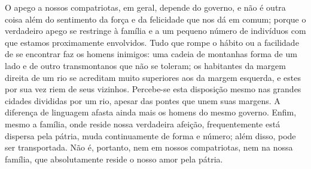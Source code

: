  O apego a nossos compatriotas, em geral, depende do governo, e não é
outra coisa além do sentimento da força e da felicidade que nos dá em
comum; porque o verdadeiro apego se restringe à família e a um pequeno
número de indivíduos com que estamos proximamente envolvidos. Tudo que
rompe o hábito ou a facilidade de se encontrar faz os homens inimigos:
uma cadeia de montanhas forma de um lado e de outro transmontanos que
não se toleram; os habitantes da margem direita de um rio se acreditam
muito superiores aos da margem esquerda, e estes por sua vez riem de
seus vizinhos. Percebe-se esta disposição mesmo nas grandes cidades
divididas por um rio, apesar das pontes que unem suas margens. A
diferença de linguagem afasta ainda mais os homens do mesmo governo.
Enfim, mesmo a família, onde reside nossa verdadeira afeição,
frequentemente está dispersa pela pátria, muda continuamente de forma e
número; além disso, pode ser transportada. Não é, portanto, nem em
nossos compatriotas, nem na nossa família, que absolutamente reside o
nosso amor pela pátria. 

